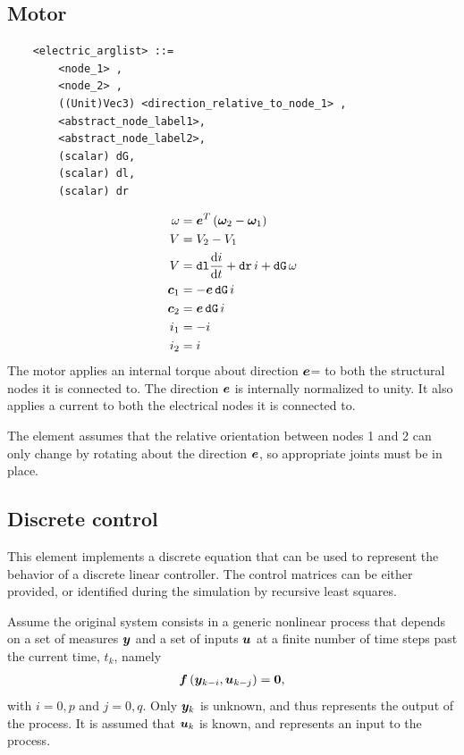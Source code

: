 \subsection{Motor}
\begin{verbatim}
    <electric_arglist> ::=
        <node_1> ,
        <node_2> , 
        ((Unit)Vec3) <direction_relative_to_node_1> ,
        <abstract_node_label1>,
        <abstract_node_label2>,
        (scalar) dG,
        (scalar) dl,
        (scalar) dr
\end{verbatim}
\begin{subequations}
\begin{align}
	\omega &= \boldsymbol{e}^T \left( \boldsymbol{\omega}_2 - \boldsymbol{\omega}_1 \right) \\
	V &= V_2 - V_1 \\
	V &= \mathtt{dl} \frac{\mathrm{d}i}{\mathrm{d}t} + \mathtt{dr} \, i + \mathtt{dG} \, \omega \\
	\boldsymbol{c}_1 &= - \boldsymbol{e} \, \mathtt{dG} \, i \\
	\boldsymbol{c}_2 &= \boldsymbol{e} \, \mathtt{dG} \, i \\
	i_1 &= -i \\
	i_2 &= i
\end{align}
\end{subequations}
The motor applies an internal torque about direction
$\boldsymbol{e}$=
to both the structural nodes it is connected to.
The direction $\boldsymbol{e}$ is internally normalized to unity.
It also applies a current to both the electrical nodes it is connected to.

The element assumes that the relative orientation between nodes 1 and 2
can only change by rotating about the direction $\boldsymbol{e}$, so appropriate
joints must be in place.


\subsection{Discrete control}\label{sec:EL:DISCCTRL}
This element implements a discrete equation
that can be used to represent the behavior
of a discrete linear controller.
The control matrices can be either provided,
or identified during the simulation by recursive least squares.

Assume the original system consists in a generic nonlinear process
that depends on a set of measures $\boldsymbol{y}$ and a set of inputs $\boldsymbol{u}$
at a finite number of time steps past the current time, $t_k$, namely
\begin{align}
	\boldsymbol{f}\left( \boldsymbol{y}_{k - i}, \boldsymbol{u}_{k - j} \right) = \boldsymbol{0} ,
\end{align}
with $i=0,p$ and $j=0,q$.
Only $\boldsymbol{y}_k$ is unknown, and thus represents the output of the process.
It is assumed that $\boldsymbol{u}_k$ is known, and represents an input
to the process.

